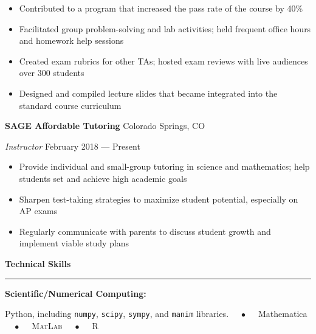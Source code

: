 \documentclass{article}
\begin{document}
\vspace{-0.5em}

\begin{itemize}[leftmargin=6.0em]
\setlength{\itemsep}{0em}
\item Contributed to a program that increased the pass rate of the course by 40\%
\item Facilitated group problem-solving and lab activities; held frequent office hours and homework help sessions
\item Created exam rubrics for other TAs; hosted exam reviews with live audiences over 300 students
\item Designed and compiled lecture slides that became integrated into the standard course curriculum
\end{itemize}

\hspace{1.5em} \textbf{SAGE Affordable Tutoring} \hfill Colorado Springs, CO

\hspace{1.5em} \textit{Instructor} \hfill February 2018 --- Present

\vspace{-0.5em}

\begin{itemize}[leftmargin=6.0em]
\setlength{\itemsep}{0em}
\item Provide individual and small-group tutoring in science and mathematics; help students set and achieve high academic goals
\item Sharpen test-taking strategies to maximize student potential, especially on AP exams
\item Regularly communicate with parents to discuss student growth and implement viable study plans
\end{itemize}

\vspace{1em}

\textbf{\Large{Technical Skills}} \\[-0.5em]
\rule{\textwidth}{1pt}

\hspace{1.5em} \textbf{Scientific/Numerical Computing:}

\hspace{3.0em} Python, including \texttt{numpy}, \texttt{scipy}, \texttt{sympy}, and \texttt{manim} libraries. $\quad\bullet\quad$ Mathematica $\quad\bullet\quad$ \textsc{MatLab} $\quad\bullet\quad$ R

\vspace{0.5em}
\end{document}
